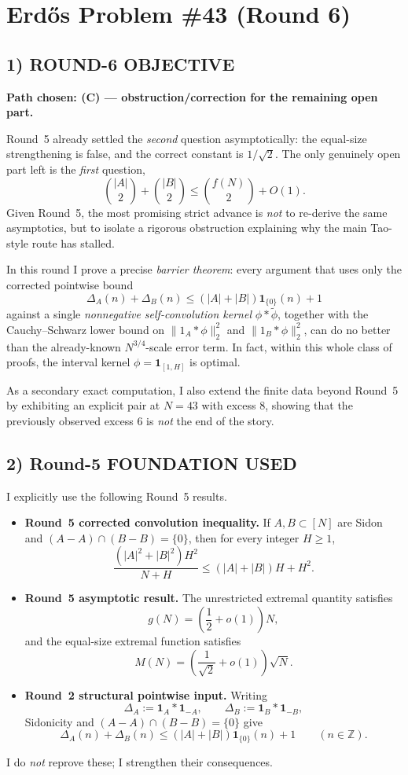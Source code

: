 \section{Erd\H{o}s Problem \#43 (Round 6)}

\subsection{1) ROUND-6 OBJECTIVE}

\textbf{Path chosen: (C) --- obstruction/correction for the remaining open part.}

Round~5 already settled the \emph{second} question asymptotically: the equal-size strengthening is false, and the correct constant is $1/\sqrt2$.  The only genuinely open part left is the \emph{first} question,
\[
\binom{|A|}{2}+\binom{|B|}{2}\le \binom{f(N)}{2}+O(1).
\]
Given Round~5, the most promising strict advance is \emph{not} to re-derive the same asymptotics, but to isolate a rigorous obstruction explaining why the main Tao-style route has stalled.

In this round I prove a precise \emph{barrier theorem}: every argument that uses only the corrected pointwise bound
\[
\Delta_A(n)+\Delta_B(n)\le (|A|+|B|)\mathbf 1_{\{0\}}(n)+1
\]
against a single \emph{nonnegative self-convolution kernel} $\phi*\widetilde \phi$, together with the Cauchy--Schwarz lower bound on $\|1_A*\phi\|_2^2$ and $\|1_B*\phi\|_2^2$, can do no better than the already-known $N^{3/4}$-scale error term.  In fact, within this whole class of proofs, the interval kernel $\phi=\mathbf 1_{[1,H]}$ is optimal.

As a secondary exact computation, I also extend the finite data beyond Round~5 by exhibiting an explicit pair at $N=43$ with excess $8$, showing that the previously observed excess $6$ is \emph{not} the end of the story.

\subsection{2) Round-5 FOUNDATION USED}

I explicitly use the following Round~5 results.
\begin{itemize}
\item \textbf{Round~5 corrected convolution inequality.} If $A,B\subset[N]$ are Sidon and $(A-A)\cap(B-B)=\{0\}$, then for every integer $H\ge 1$,
\[
\frac{(|A|^2+|B|^2)H^2}{N+H}\le (|A|+|B|)H+H^2.
\]
\item \textbf{Round~5 asymptotic result.} The unrestricted extremal quantity satisfies
\[
 g(N)=\left(\frac12+o(1)\right)N,
\]
and the equal-size extremal function satisfies
\[
M(N)=\left(\frac1{\sqrt2}+o(1)\right)\sqrt N.
\]
\item \textbf{Round~2 structural pointwise input.} Writing
\[
\Delta_A:=\mathbf 1_A*\mathbf 1_{-A},\qquad \Delta_B:=\mathbf 1_B*\mathbf 1_{-B},
\]
Sidonicity and $(A-A)\cap(B-B)=\{0\}$ give
\[
\Delta_A(n)+\Delta_B(n)\le (|A|+|B|)\mathbf 1_{\{0\}}(n)+1
\qquad (n\in \mathbb Z).
\]
\end{itemize}
I do \emph{not} reprove these; I strengthen their consequences.

